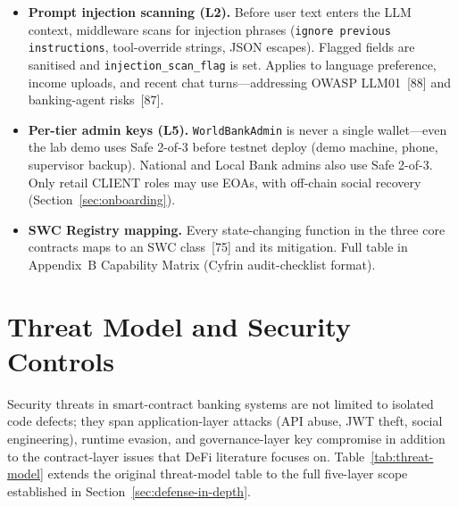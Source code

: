 \documentclass[12pt, a4paper]{report}
\begin{document}
\begin{itemize}[noitemsep]
\item \textbf{Prompt injection scanning (L2).} Before user text enters the LLM context, middleware scans for injection phrases (\texttt{ignore previous instructions}, tool-override strings, JSON escapes). Flagged fields are sanitised and \texttt{injection\_scan\_flag} is set. Applies to language preference, income uploads, and recent chat turns---addressing OWASP LLM01~[88] and banking-agent risks~[87].

\item \textbf{Per-tier admin keys (L5).} \texttt{WorldBankAdmin} is never a single wallet---even the lab demo uses Safe 2-of-3 before testnet deploy (demo machine, phone, supervisor backup). National and Local Bank admins also use Safe 2-of-3. Only retail CLIENT roles may use EOAs, with off-chain social recovery (Section~\ref{sec:onboarding}).

\item \textbf{SWC Registry mapping.} Every state-changing function in the three core contracts maps to an SWC class~[75] and its mitigation. Full table in Appendix~B Capability Matrix (Cyfrin audit-checklist format).
\end{itemize}

\section{Threat Model and Security Controls}
\label{sec:threat-model}

Security threats in smart-contract banking systems are not limited to isolated code defects; they span application-layer attacks (API abuse, JWT theft, social engineering), runtime evasion, and governance-layer key compromise in addition to the contract-layer issues that DeFi literature focuses on. Table~\ref{tab:threat-model} extends the original threat-model table to the full five-layer scope established in Section~\ref{sec:defense-in-depth}.
\end{document}
